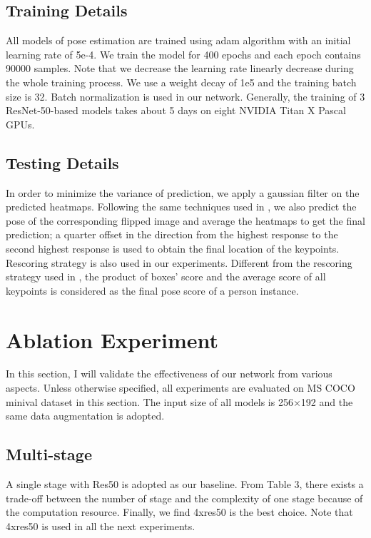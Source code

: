 \subsection{Training Details}
All models of pose estimation are trained using adam algorithm with an initial learning rate of 5e-4.
We train the model for 400 epochs and each epoch contains 90000 samples.
Note that we decrease the learning rate linearly decrease during the whole training process.
We use a weight decay of 1e5 and the training batch size is 32.
Batch normalization is used in our network.
Generally, the training of 3 ResNet-50-based models takes about 5 days on eight NVIDIA Titan X Pascal GPUs.

\subsection{Testing Details}
In order to minimize the variance of prediction, we apply a gaussian filter on the predicted heatmaps.
Following the same techniques used in \cite{newell2016stacked}, we also predict the pose of the corresponding flipped image and average the heatmaps to get the final prediction; a quarter
offset in the direction from the highest response to the second
highest response is used to obtain the final location of
the keypoints.
Rescoring strategy is also used in our experiments.
Different from the rescoring strategy used in \cite{papandreou2017towards},
the product of boxes’ score and the average score of all keypoints
is considered as the final pose score of a person instance.

\section{Ablation Experiment}
In this section, I will validate the effectiveness of our
network from various aspects. Unless otherwise specified,
all experiments are evaluated on MS COCO minival dataset
in this section. The input size of all models is 256×192
and the same data augmentation is adopted.

\subsection{Multi-stage}
A single stage with Res50 is adopted as our baseline. From Table 3, there exists a trade-off between the number of stage and the complexity of one stage because of the computation resource.
Finally, we find 4xres50 is the best choice.  Note that 4xres50 is used in all the next experiments.


